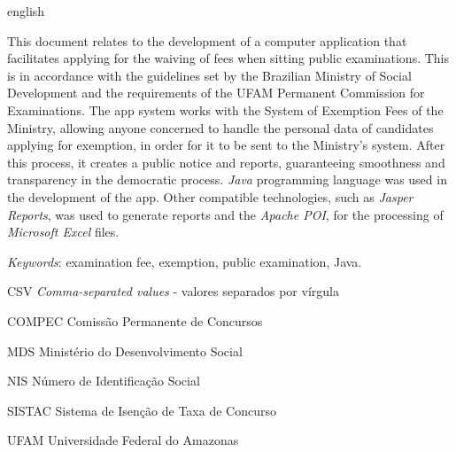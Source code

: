 \documentclass[
	12pt,			%
	openright,		%
	oneside,	
	a4paper,		%
	english,		%
	brazil			%
]{abntex2/abntex2}  %
\begin{document}
\begin{abstracteng}[Abstract]
 \begin{otherlanguage*}{english}
 	
 	This document relates to the development of a computer application that facilitates applying for the waiving of fees when sitting public examinations. This is in accordance with the guidelines set by the Brazilian Ministry of Social Development and the requirements of the UFAM Permanent Commission for Examinations. The app system works with the System of Exemption Fees of the Ministry, allowing anyone concerned to handle the personal data of candidates applying for exemption, in order for it to be sent to the Ministry's system. After this process, it creates a public notice and reports, guaranteeing smoothness and transparency in the democratic process. \textit{Java} programming language was used in the development of the app. Other compatible technologies, such as \textit{Jasper Reports}, was used to generate reports and the \textit{Apache POI}, for the processing of \textit{Microsoft Excel} files.

   \vspace{\onelineskip}
 
   \noindent 
   \textit{Keywords}: examination fee, exemption, public examination, Java.
   
 \end{otherlanguage*}
\end{abstracteng}

\listoffigures*
\cleardoublepage

\listoftables*
\cleardoublepage

\begin{siglas}
	\item[CSV] \textit{Comma-separated values} - valores separados por vírgula
  \item[COMPEC] Comissão Permanente de Concursos
  \item[MDS] Ministério do Desenvolvimento Social
  \item[NIS] Número de Identificação Social
  \item[SISTAC] Sistema de Isenção de Taxa de Concurso
  \item[UFAM] Universidade Federal do Amazonas
\end{siglas}
\end{document}
